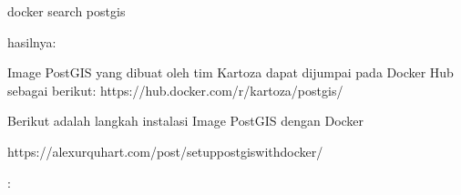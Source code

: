 \documentclass[letterpaper,10pt,english]{sphinxmanual}
\begin{document}
\begin{sphinxVerbatim}[commandchars=\\\{\}]
docker search postgis
\end{sphinxVerbatim}

hasilnya:


Image PostGIS yang dibuat oleh tim Kartoza dapat dijumpai pada Docker Hub sebagai berikut:
https://hub.docker.com/r/kartoza/postgis/

Berikut adalah langkah instalasi Image PostGIS dengan Docker %
\begin{footnote}[2]\sphinxAtStartFootnote
https://alexurquhart.com/post/set\sphinxhyphen{}up\sphinxhyphen{}postgis\sphinxhyphen{}with\sphinxhyphen{}docker/
%
\end{footnote}:
\end{document}
